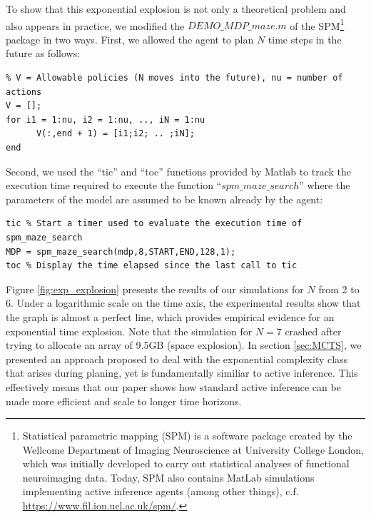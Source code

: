\documentclass[twoside,11pt]{article}
\begin{document}
To show that this exponential explosion is not only a theoretical problem and also appears in practice, we modified the $DEMO\_MDP\_maze.m$ of the SPM\footnote{Statistical parametric mapping (SPM) is a software package created by the Wellcome Department of Imaging Neuroscience at University College London, which was initially developed to carry out statistical analyses of functional neuroimaging data. Today, SPM also contains MatLab simulations implementing active inference agents (among other things), c.f. \url{https://www.fil.ion.ucl.ac.uk/spm/}. } package in two ways. First, we allowed the agent to plan $N$ time steps in the future as follows:
\begin{verbatim}
% V = Allowable policies (N moves into the future), nu = number of actions
V = [];
for i1 = 1:nu, i2 = 1:nu, .., iN = 1:nu
      V(:,end + 1) = [i1;i2; .. ;iN];
end
\end{verbatim}

Second, we used the ``tic'' and ``toc'' functions provided by Matlab to track the execution time required to execute the function ``$spm\_maze\_search$'' where the parameters of the model are assumed to be known already by the agent:
\begin{verbatim}
tic % Start a timer used to evaluate the execution time of spm_maze_search
MDP = spm_maze_search(mdp,8,START,END,128,1);
toc % Display the time elapsed since the last call to tic
\end{verbatim}

Figure \ref{fig:exp_explosion} presents the results of our simulations for $N$ from 2 to 6. Under a logarithmic scale on the time axis, the experimental results show that the graph is almost a perfect line, which provides empirical evidence for an exponential time explosion. Note that the simulation for $N = 7$ crashed after trying to allocate an array of 9.5GB (space explosion). In section \ref{sec:MCTS}, we presented an approach proposed to deal with the exponential complexity class that arises during planing, yet is fundamentally similiar to active inference. This effectively means that our paper shows how standard active inference can be made more efficient and scale to longer time horizons.
\end{document}
